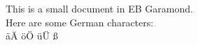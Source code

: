 \documentclass{article}
\begin{document}
This is a small document in EB Garamond.
\\
Here are some German characters:
\\
äÄ öÖ üÜ ß
\end{document}
